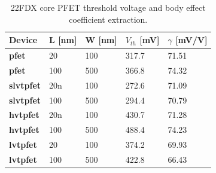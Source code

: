 			\begin{table}[htb!]
				\centering
				\def\arraystretch{1.5}		
				\setlength\arrayrulewidth{1pt}
				\setlength{\tabcolsep}{1em} %
				\fontfamily{\sfdefault}\selectfont 
				\begin{tabular}{|l|l|l|l|l|}	
					\hline 
					\rule[-1ex]{0pt}{2.5ex} \cellcolor{gray!40}\textbf{Device} & \cellcolor{gray!40}\textbf{L [nm]} & \cellcolor{gray!40}\textbf{W [nm]} & \cellcolor{gray!40}\textbf{$V_{th}$ [mV]} & \cellcolor{gray!40}\textbf{$\gamma$ [mV/V]}\\ 
					\hline 
					\rule[-1ex]{0pt}{2.5ex} \textbf{pfet} & 20 & 100 & 317.7 & 71.51 \\ 
					\hline 
					\rule[-1ex]{0pt}{2.5ex} \textbf{pfet} & 100 & 500 & 366.8 & 74.32 \\ 
					\hline 
					\rule[-1ex]{0pt}{2.5ex} \textbf{slvtpfet} & 20n & 100 & 272.6 & 71.09 \\ 
					\hline 
					\rule[-1ex]{0pt}{2.5ex} \textbf{slvtpfet} & 100 & 500 & 294.4 & 70.79 \\ 
					\hline 
					\rule[-1ex]{0pt}{2.5ex} \textbf{hvtpfet} & 20n & 100 & 430.7 & 71.28 \\ 
					\hline 
					\rule[-1ex]{0pt}{2.5ex} \textbf{hvtpfet} & 100 & 500 & 488.4 & 74.23 \\ 
					\hline 
					\rule[-1ex]{0pt}{2.5ex} \textbf{lvtpfet} & 20 & 100 & 374.2 & 69.93 \\ 
					\hline 
					\rule[-1ex]{0pt}{2.5ex} \textbf{lvtpfet} & 100 & 500 & 422.8 & 66.43 \\ 
					\hline 
				\end{tabular} 
				\caption{22FDX core PFET threshold voltage and body effect coefficient extraction.}
				\label{pfet_vth_gamma}
			\end{table} 	
\FloatBarrier



